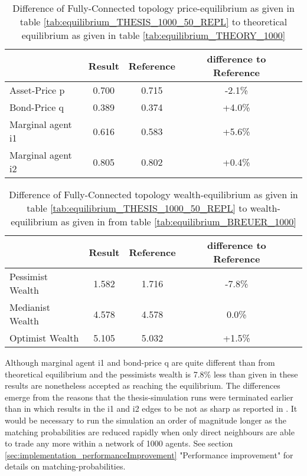 \documentclass[Bachelorarbeit.tex]{subfiles}
\begin{document}
\begin{table}[H]
	\caption{Difference of Fully-Connected topology price-equilibrium as given in table \ref{tab:equilibrium_THESIS_1000_50_REPL} to theoretical equilibrium as given in table \ref{tab:equilibrium_THEORY_1000}}
	\centering
	\begin{tabular} { l c c c r }
		& Result & Reference & difference to Reference \\
		\hline
		Asset-Price p & 0.700 & 0.715 & -2.1\% \\
		Bond-Price q & 0.389 & 0.374 & +4.0\% \\
		Marginal agent i1 & 0.616  & 0.583 & +5.6\% \\
		Marginal agent i2 & 0.805 & 0.802 & +0.4\% \\
		\hline
	\end{tabular}
\end{table} 

\begin{table}[H]
	\caption{Difference of Fully-Connected topology wealth-equilibrium as given in table \ref{tab:equilibrium_THESIS_1000_50_REPL} to wealth-equilibrium as given in \cite{Breuer2015} from table \ref{tab:equilibrium_BREUER_1000}}
	\centering
	\begin{tabular} { l c c c r }
		& Result & Reference & difference to Reference \\
		\hline
		Pessimist Wealth  & 1.582 & 1.716 & -7.8\% \\
		Medianist Wealth & 4.578 & 4.578 & 0.0\% \\
		Optimist Wealth & 5.105 & 5.032 & +1.5\% \\
		\hline
	\end{tabular}
\end{table} 

Although marginal agent i1 and bond-price q are quite different than from theoretical equilibrium and the pessimists wealth is 7.8\% less than given in \cite{Breuer2015} these results are nonetheless accepted as reaching the equilibrium. The differences emerge from the reasons that the thesis-simulation runs were terminated earlier than in \cite{Breuer2015} which results in the i1 and i2 edges to be not as sharp as reported in \cite{Breuer2015}. It would be necessary to run the simulation an order of magnitude longer as the matching probabilities are reduced rapidly when only direct neighbours are able to trade any more within a network of 1000 agents. See section \ref{sec:implementation_performanceImprovement} "Performance improvement" for details on matching-probabilities.
\end{document}
